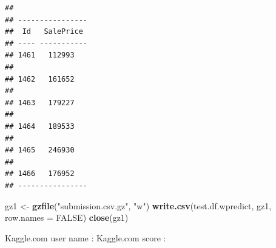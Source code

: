 \documentclass[]{article}
\newenvironment{Shaded}{\begin{snugshade}}{\end{snugshade}}
\newcommand{\KeywordTok}[1]{\textcolor[rgb]{0.13,0.29,0.53}{\textbf{{#1}}}}
\newcommand{\DataTypeTok}[1]{\textcolor[rgb]{0.13,0.29,0.53}{{#1}}}
\newcommand{\StringTok}[1]{\textcolor[rgb]{0.31,0.60,0.02}{{#1}}}
\newcommand{\OtherTok}[1]{\textcolor[rgb]{0.56,0.35,0.01}{{#1}}}
\newcommand{\NormalTok}[1]{{#1}}
\begin{document}
\begin{verbatim}
## 
## ----------------
##  Id   SalePrice 
## ---- -----------
## 1461   112993   
## 
## 1462   161652   
## 
## 1463   179227   
## 
## 1464   189533   
## 
## 1465   246930   
## 
## 1466   176952   
## ----------------
\end{verbatim}

\begin{Shaded}
\begin{Highlighting}[]
\NormalTok{gz1 <-}\StringTok{ }\KeywordTok{gzfile}\NormalTok{(}\StringTok{"submission.csv.gz"}\NormalTok{, }\StringTok{"w"}\NormalTok{)}
\KeywordTok{write.csv}\NormalTok{(test.df.wpredict, gz1, }\DataTypeTok{row.names =} \OtherTok{FALSE}\NormalTok{)}
\KeywordTok{close}\NormalTok{(gz1)}
\end{Highlighting}
\end{Shaded}

Kaggle.com user name : Kaggle.com score :
\end{document}
